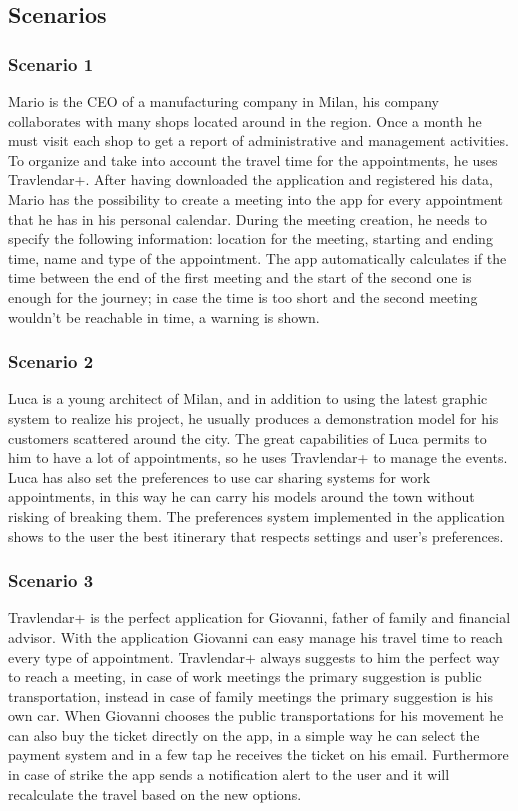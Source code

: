 \subsection{Scenarios}
\subsubsection{Scenario 1}
Mario is the CEO of a manufacturing company in Milan, his company collaborates with many shops located around in the region. Once a month he must visit each shop to get a report of administrative and management activities. To organize and take into account the travel time for the appointments, he uses Travlendar+. After having downloaded the application and registered his data, Mario has the possibility to create a meeting into the app for every appointment that he has in his personal calendar. During the meeting creation, he needs to specify the following information: location for the meeting, starting and ending time, name and type of the appointment. The app automatically calculates if the time between the end of the first meeting and the start of the second one is enough for the journey; in case the time is too short and the second meeting wouldn't be reachable in time, a warning is shown.

\subsubsection{Scenario 2}
Luca is a young architect of Milan, and in addition to using the latest graphic system to realize his project, he usually produces a demonstration model for his customers scattered around the city. The great capabilities of Luca permits to him to have a lot of appointments, so he uses Travlendar+ to manage the events. Luca has also set the preferences to use car sharing systems for work appointments, in this way he can carry his models around the town without risking of breaking them. The preferences system implemented in the application shows  to the user the best itinerary that respects settings and user's preferences.

\subsubsection{Scenario 3}
Travlendar+ is the perfect application for Giovanni, father of family and financial advisor.
With the application Giovanni can easy manage his travel time to reach every type of appointment. Travlendar+ always suggests to him the perfect way to reach a meeting, in case of work meetings the primary suggestion is public transportation, instead in case of family meetings the primary suggestion is his own car. When Giovanni chooses the public transportations for his movement he can also buy the ticket directly on the app, in a simple way he can select the payment system and in a few tap he receives the ticket on his email. Furthermore in case of strike the app sends a notification alert to the user and it will recalculate the travel based on the new options.

